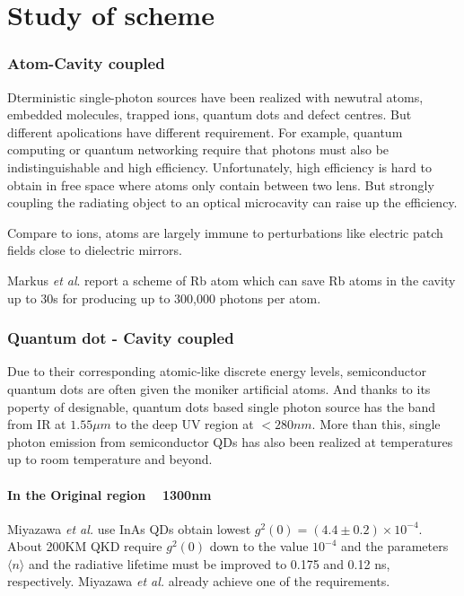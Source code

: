 \documentclass[10pt]{article}
\begin{document}
    \part{Study of scheme}
        \section{Atom-Cavity coupled}
            Dterministic single-photon sources have been realized with newutral atoms, embedded molecules, trapped ions, quantum dots and defect centres.
            But different apolications have different requirement. For example, quantum computing or quantum networking require that photons must also be indistinguishable
            and high efficiency. Unfortunately, high efficiency is hard to obtain in free space where atoms only contain between two lens. But strongly coupling 
            the radiating object to an optical microcavity can raise up the efficiency.\par

            Compare to ions, atoms are largely immune to perturbations like electric patch fields close to dielectric mirrors.

            Markus \textit{et al}. report a scheme of Rb atom which can save Rb atoms in the cavity up to 30s for producing up to 300,000 photons per atom.\cite{hijlkema_single-photon_2007}
        \section{Quantum dot - Cavity coupled}
        Due to their corresponding atomic-like discrete energy levels, semiconductor quantum dots are often given the moniker artificial atoms. And thanks
        to its poperty of designable, quantum dots based single photon source has the band from IR at $1.55 \mu m$ to the deep UV region at $<280 nm$.
        More than this, single photon emission from semiconductor QDs has also been realized at temperatures up to room temperature and beyond.

            \subsection{In the Original region ~ 1300nm}
                Miyazawa \textit{et al.} use InAs QDs obtain lowest $g^2(0) = (4.4\pm0.2)\times 10^{-4}$.\cite{miyazawa_single-photon_2016} About 200KM QKD require $g^2(0)$ down to the 
                value $10^{-4}$ and the parameters $\langle n \rangle$ and the radiative lifetime must be improved to 0.175 and 0.12 ns, respectively.
                Miyazawa \textit{et al.} already achieve one of the requirements.
\end{document}
